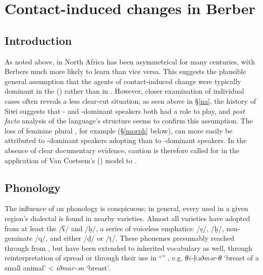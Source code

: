 \documentclass[output=paper]{langsci/langscibook}
\begin{document}
 \section{Contact-induced changes in Berber}


 \subsection{Introduction}


As noted above,  in North Africa has been asymmetrical for many centuries, with Berbers much more likely to learn  than vice versa. This suggests the plausible general assumption that the agents of contact-induced change were typically dominant in the ()  rather than in .  However, closer examination of individual cases often reveals a less clear-cut situation; as seen above in §\ref{na}, the history of Siwi suggests that - and -dominant speakers both had a role to play, and \textit{post} \textit{facto} analysis of the language's structure seems to confirm this assumption.  The loss of feminine plural , for example (§\ref{morph} below), can more easily be attributed to -dominant speakers adopting  than to -dominant speakers.  In the absence of clear documentary evidence, caution is therefore called for in the application of Van Coetsem's (\citeyear{VanCoetsem1988,VanCoetsem2000}) model to .


 
 \subsection{Phonology}


The influence of  on  phonology is conspicuous; in general, every  used in a given region's dialectal  is found in nearby  varieties. Almost all   varieties have adopted from  at least the  /ʕ/ and /ḥ/, a series of voiceless emphatics: /ṣ/, /ḫ/, non-geminate /q/, and either /ḍ/ or /ṭ/. These phonemes presumably reached  through  from , but have been extended to inherited vocabulary as well, through reinterpretation of  spread or through their use in “” \citep[199]{Kossmann2013book}, e.g.  \textit{θi-ḥəðmər-θ} `breast of a small animal' < \textit{iðmar-ən} `breast'.
\end{document}
